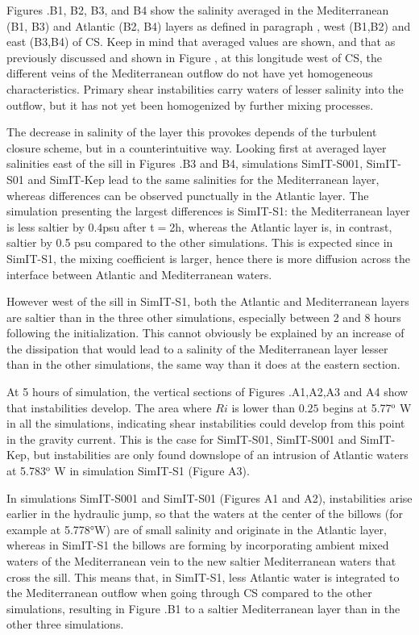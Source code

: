 Figures .B1, B2, B3, and B4 show the salinity averaged in the Mediterranean (B1, B3) and Atlantic (B2, B4) layers as defined in paragraph , west (B1,B2) and east (B3,B4) of CS. Keep in mind that averaged values are shown, and that as previously discussed and shown in Figure , at this longitude west of CS, the different veins of the Mediterranean outflow do not have yet homogeneous characteristics. Primary shear instabilities carry waters of lesser salinity into the outflow, but it has not yet been homogenized by further mixing processes.

The decrease in salinity of the layer this provokes depends of the turbulent closure scheme, but in a counterintuitive way. Looking first at averaged layer salinities east of the sill in Figures .B3 and B4, simulations SimIT-S001, SimIT-S01 and SimIT-Kep lead to the same salinities for the Mediterranean layer, whereas differences can be observed punctually in the Atlantic layer. The simulation presenting the largest differences is SimIT-S1: the Mediterranean layer is less saltier by 0.4psu after t$=$2h, whereas the Atlantic layer is, in contrast, saltier by 0.5 psu compared to the other simulations. This is expected since in SimIT-S1, the mixing coefficient is larger, hence there is more diffusion across the interface between Atlantic and Mediterranean waters.

However west of the sill in SimIT-S1, both the Atlantic and Mediterranean layers are saltier than in the three other simulations, especially between 2 and 8 hours following the initialization. This cannot obviously be explained by an increase of the dissipation that would lead to a salinity of the Mediterranean layer lesser than in the other simulations, the same way than it does at the eastern section.

At 5 hours of simulation, the vertical sections of Figures .A1,A2,A3 and A4 show that instabilities develop. The area where $Ri$ is lower than $0.25$ begins at 5.77$^\text{o}$ W in all the simulations, indicating shear instabilities could develop from this point in the gravity current. This is the case for SimIT-S01, SimIT-S001 and SimIT-Kep, but instabilities are only found downslope of an intrusion of Atlantic waters at 5.783$^\text{o}$ W in simulation SimIT-S1 (Figure A3).

In simulations SimIT-S001 and SimIT-S01 (Figures A1 and A2), instabilities arise earlier in the hydraulic jump, so that the waters at the center of the billows (for example at 5.778°W) are of small salinity and originate in the Atlantic layer, whereas in SimIT-S1 the billows are forming by incorporating ambient mixed waters of the Mediterranean vein to the new saltier Mediterranean waters that cross the sill. This means that, in SimIT-S1, less Atlantic water is integrated to the Mediterranean outflow when going through CS compared to the other simulations, resulting in Figure .B1 to a saltier Mediterranean layer than in the other three simulations.
 

